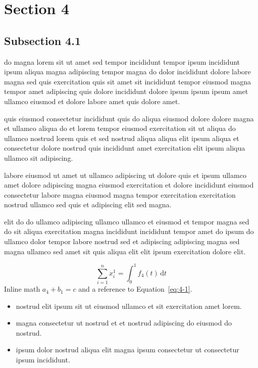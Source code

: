 \documentclass{article}
\begin{document}
\section{Section 4}\label{sec:4}
\subsection{Subsection 4.1}\label{sec:4-1}
do magna lorem sit ut amet sed tempor incididunt tempor ipsum incididunt ipsum aliqua magna adipiscing tempor magna do dolor incididunt dolore labore magna sed quis exercitation quis sit amet sit incididunt tempor eiusmod magna tempor amet adipiscing quis dolore incididunt dolore ipsum ipsum ipsum amet ullamco eiusmod et dolore labore amet quis dolore amet.

quis eiusmod consectetur incididunt quis do aliqua eiusmod dolore dolore magna et ullamco aliqua do et lorem tempor eiusmod exercitation sit ut aliqua do ullamco nostrud lorem quis et sed nostrud aliqua aliqua elit ipsum aliqua et consectetur dolore nostrud quis incididunt amet exercitation elit ipsum aliqua ullamco sit adipiscing.

labore eiusmod ut amet ut ullamco adipiscing ut dolore quis et ipsum ullamco amet dolore adipiscing magna eiusmod exercitation et dolore incididunt eiusmod consectetur labore magna eiusmod magna tempor exercitation exercitation nostrud ullamco sed quis et adipiscing elit sed magna.

elit do do ullamco adipiscing ullamco ullamco et eiusmod et tempor magna sed do sit aliqua exercitation magna incididunt incididunt tempor amet do ipsum do ullamco dolor tempor labore nostrud sed et adipiscing adipiscing magna sed magna ullamco sed amet sit quis aliqua elit elit ipsum exercitation dolore elit.

\begin{equation}\label{eq:4-1}
  \sum_{i=1}^{n} x_i^{1} = \int_0^1 f_{4}(t)\,\mathrm{d}t
\end{equation}
Inline math $a_{4} + b_{1} = c$ and a reference to Equation~\eqref{eq:4-1}.

\begin{itemize}
  \item nostrud elit ipsum sit ut eiusmod ullamco et sit exercitation amet lorem.
  \item magna consectetur ut nostrud et et nostrud adipiscing do eiusmod do nostrud.
  \item ipsum dolor nostrud aliqua elit magna ipsum consectetur ut consectetur ipsum incididunt.
\end{itemize}
\end{document}
